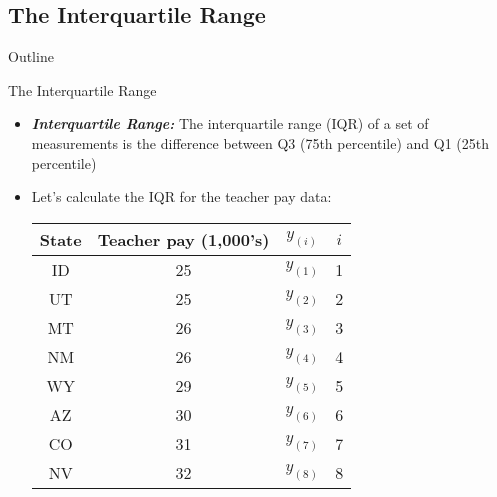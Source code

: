\documentclass[xcolor=dvipsnames]{beamer}
\begin{document}
\subsection{The Interquartile Range}
\begin{frame}{Outline}
	\tableofcontents[currentsection,subsectionstyle=show/shaded/hide]
\end{frame}

\begin{frame}{The Interquartile Range}
	\begin{itemize}
		\item \textbf{\emph{Interquartile Range:}} The interquartile range (IQR) of a set of measurements is the difference between Q3 (75th percentile) and Q1 (25th percentile)
		\item Let's calculate the IQR for the teacher pay data:
			\begin{center}
			\begin{tabular}{|c|c|c|c|}
				\hline 
				\textbf{State} & \textbf{Teacher pay (1,000's)} & $y_{(i)}$ & $i$ \\ 
				\hline \hline 
				ID & 25 & $y_{(1)}$& 1 \\  \hline 
				UT &  25  & $y_{(2)}$& 2\\ \hline 
				MT &  26  & $y_{(3)}$& 3\\ \hline 
				NM &  26  & $y_{(4)}$& 4\\ \hline 
				WY &  29  & $y_{(5)}$& 5\\ \hline 
				AZ & 30  & $y_{(6)}$& 6\\ \hline 
				CO &  31 & $y_{(7)}$& 7\\ \hline
				NV & 32  & $y_{(8)}$& 8\\ \hline 
			\end{tabular} 
		\end{center}
	\end{itemize}
\end{frame}
\end{document}
